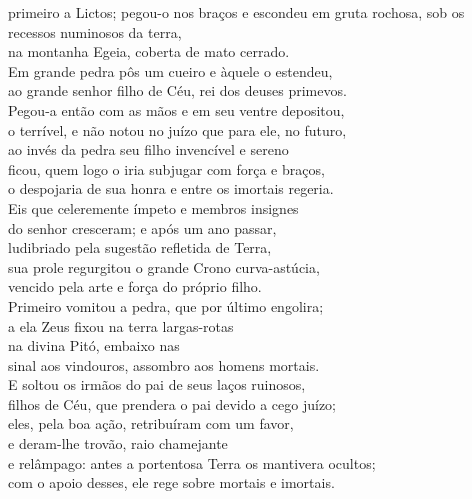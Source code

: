 \begin{pages}
\begin{Rightside}
primeiro a Lictos; pegou-o nos braços e escondeu
em gruta rochosa, sob os recessos numinosos da terra,\\
na montanha Egeia, coberta de mato cerrado.\\
Em grande pedra pôs um cueiro e àquele o estendeu, \\
ao grande senhor filho de Céu, rei dos deuses primevos.\\
Pegou-a então com as mãos e em seu ventre depositou,\\
o terrível, e não notou no juízo que para ele, no futuro,\\
ao invés da pedra seu filho invencível e sereno\\
ficou, quem logo o iria subjugar com força e braços, \\
o despojaria de sua honra e entre os imortais regeria.\\

\quad{}Eis que celeremente ímpeto e membros insignes\\
do senhor cresceram; e após um ano passar,\\
ludibriado pela sugestão refletida de Terra,\\
sua prole regurgitou o grande Crono curva-astúcia, \\
vencido pela arte e força do próprio filho.\\
Primeiro vomitou a pedra, que por último engolira;\\
a ela Zeus fixou na terra largas-rotas\\
na divina Pitó, embaixo nas \\
sinal aos vindouros, assombro aos homens mortais. \\

\quad{}E soltou os irmãos do pai de seus laços ruinosos,\\
filhos de Céu, que prendera o pai devido a cego juízo;\\
eles, pela boa ação, retribuíram com um favor,\\
e deram-lhe trovão, raio chamejante\\
e relâmpago: antes a portentosa Terra os mantivera ocultos; \\
com o apoio desses, ele rege sobre mortais e imortais.\\


\end{Rightside}
\end{pages}
